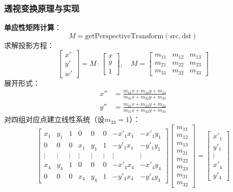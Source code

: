 \documentclass[12pt, a4paper]{article}
\begin{document}
\subsubsection{透视变换原理与实现}
\textbf{单应性矩阵计算}：
\begin{equation}
M = \text{getPerspectiveTransform}(\text{src}, \text{dst})
\end{equation}
求解投影方程：
\begin{equation}
\begin{bmatrix}
x' \\ y' \\ w'
\end{bmatrix}
= M \cdot
\begin{bmatrix}
x \\ y \\ 1
\end{bmatrix}, \quad 
M = \begin{bmatrix}
m_{11} & m_{12} & m_{13} \\
m_{21} & m_{22} & m_{23} \\
m_{31} & m_{32} & m_{33}
\end{bmatrix}
\end{equation}
展开形式：
\begin{align}
x'' &= \frac{m_{11}x + m_{12}y + m_{13}}{m_{31}x + m_{32}y + m_{33}} \\
y'' &= \frac{m_{21}x + m_{22}y + m_{23}}{m_{31}x + m_{32}y + m_{33}}
\end{align}
对四组对应点建立线性系统（设$m_{33}=1$）：
\begin{equation}
\begin{bmatrix}
x_1 & y_1 & 1 & 0 & 0 & 0 & -x'_1x_1 & -x'_1y_1 \\
0 & 0 & 0 & x_1 & y_1 & 1 & -y'_1x_1 & -y'_1y_1 \\
\vdots & \vdots & \vdots & \vdots & \vdots & \vdots & \vdots & \vdots \\
x_4 & y_4 & 1 & 0 & 0 & 0 & -x'_4x_4 & -x'_4y_4 \\
0 & 0 & 0 & x_4 & y_4 & 1 & -y'_4x_4 & -y'_4y_4
\end{bmatrix}
\begin{bmatrix}
m_{11} \\ m_{12} \\ m_{13} \\ m_{21} \\ m_{22} \\ m_{23} \\ m_{31} \\ m_{32}
\end{bmatrix}
= 
\begin{bmatrix}
x'_1 \\ y'_1 \\ \vdots \\ x'_4 \\ y'_4
\end{bmatrix}
\end{equation}
\end{document}
